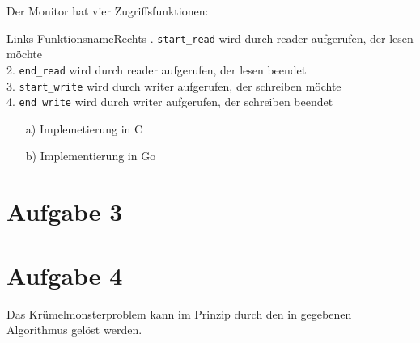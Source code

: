 \documentclass[11pt,a4paper,DIV=10,]{scrartcl}
\begin{document}
Der Monitor hat vier Zugriffsfunktionen: 
\begin{tabbing}
Links \= Funktionsname\= Rechts .\> \texttt{start\_read} \> wird durch reader aufgerufen, der lesen möchte \\
2.\> \texttt{end\_read} \>  wird durch reader aufgerufen, der lesen beendet\\
3.\> \texttt{start\_write} \> wird durch writer aufgerufen, der schreiben möchte \\
4.\> \texttt{end\_write} \> wird durch writer aufgerufen, der schreiben beendet \\
\end{tabbing}
\begin{enumerate}
\item[a)] Implemetierung in C
\item[b)] Implementierung in Go
\end{enumerate}
\section*{Aufgabe 3}
\section*{Aufgabe 4}
Das Krümelmonsterproblem kann im Prinzip durch den in \citep{Maurer.2012} gegebenen Algorithmus gelöst werden.


\end{document}
